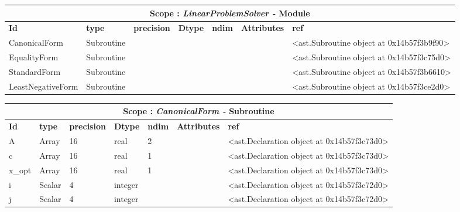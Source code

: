 \documentclass{report}
\begin{document}
 \vspace{1cm}

\begin{center}
\begin{longtable}{|p{3.5cm}|p{1.5cm}|p{1.5cm}|p{1.5cm}|p{1cm}|p{2cm}|p{4cm}| }
\hline
\multicolumn{7}{|c|}{\textbf{Scope : \qquad}  \textbf{\textit{LinearProblemSolver - }Module}}\\ 
\hline
\textbf{Id} & \textbf{type} & \textbf{precision} & \textbf{Dtype} & \textbf{ndim} & \textbf{Attributes} & \textbf{ref} \\\hline

CanonicalForm & Subroutine &  &  &  &  & <ast.Subroutine object at 0x14b57f3b9f90> \\\hline

EqualityForm & Subroutine &  &  &  &  & <ast.Subroutine object at 0x14b57f3c75d0> \\\hline

StandardForm & Subroutine &  &  &  &  & <ast.Subroutine object at 0x14b57f3b6610> \\\hline

LeastNegativeForm & Subroutine &  &  &  &  & <ast.Subroutine object at 0x14b57f3ce2d0> \\\hline

\end{longtable}
\end{center}

 \vspace{1cm}

\begin{center}
\begin{longtable}{|p{3.5cm}|p{1.5cm}|p{1.5cm}|p{1.5cm}|p{1cm}|p{2cm}|p{4cm}| }
\hline
\multicolumn{7}{|c|}{\textbf{Scope : \qquad}  \textbf{\textit{CanonicalForm - }Subroutine}}\\ 
\hline
\textbf{Id} & \textbf{type} & \textbf{precision} & \textbf{Dtype} & \textbf{ndim} & \textbf{Attributes} & \textbf{ref} \\\hline

A & Array & 16 & real & 2 &  & <ast.Declaration object at 0x14b57f3c73d0> \\\hline

c & Array & 16 & real & 1 &  & <ast.Declaration object at 0x14b57f3c73d0> \\\hline

x\_opt & Array & 16 & real & 1 &  & <ast.Declaration object at 0x14b57f3c73d0> \\\hline

i & Scalar & 4 & integer &  &  & <ast.Declaration object at 0x14b57f3c72d0> \\\hline

j & Scalar & 4 & integer &  &  & <ast.Declaration object at 0x14b57f3c72d0> \\\hline

\end{longtable}
\end{center}
\end{document}
